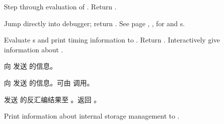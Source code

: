 \begin{LIST}{1cm}
  {
  Step through evaluation of . Return . 
  }

  {
  Jump directly into debugger; return \retval{\NIL}.
  See page \pageref{section:Format}, , for 
  and s. 
  }

  {
  Evaluate s and print timing information to
  . Return . 
  }
  {
    Interactively give information about .
  }

  {
  向  发送  的信息。
  }

  {
    向  发送  的信息。可由
     调用。
  }

  {
  发送  的反汇编结果至
  。返回 \retval{\NIL}。
  }

  {
    Print information about internal storage management to .
  }



\end{LIST}


